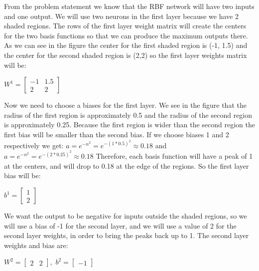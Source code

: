\documentclass{article}
\begin{document}
\noindent From the problem statement we know that the RBF network will have two inputs and one output.
We will use two neurons in the first layer because we have 2 shaded regions. 
The rows of the first layer weight matrix
will create the centers for the two basis functions so that we can produce the maximum outputs there. 
As we can see in the figure the center for the first shaded region
is (-1, 1.5) and the center for the second shaded region is (2,2) so the first layer weights matrix will be: \\
\begin{center}
  
$ W^1 = \begin{bmatrix}
  - 1 & 1.5 \\
  2 & 2
\end{bmatrix} $
\end{center}

\noindent Now we need to choose a biases for the first layer. We see in the figure that the radius of the first 
region is approximately 0.5 and the radius of the second region is approximately 0.25. 
Because the first region is wider than the second region the first bias will be smaller than the second bias.
If we choose biases 1 and 2 respectively we get:
$a = e^{-n^2}= e^{-(1*0.5)^2} \approx 0.18$ and $a = e^{-n^2}= e^{-(2*0.25)^2} \approx 0.18$
Therefore, each basis function will have a peak of 1 at the centers, and will drop to 0.18 at the edge of the regions.
So the first layer bias will be:
\begin{center}
  
  $ b^1 = \begin{bmatrix}
    1 \\
    2 
  \end{bmatrix} $
  \end{center}

  \noindent We want the output to be negative for inputs outside the shaded regions,
  so we will use a bias of -1 for the second layer, and we will use a value of 2
  for the second layer weights, in order to bring the peaks back up to 1. The second layer weights and bias are:

  \begin{center}
  
    $ W^2 = \begin{bmatrix}
      2 & 2
    \end{bmatrix},
     $
    $ b^2 = \begin{bmatrix}
      -1
    \end{bmatrix} $

    \end{center}
  
\end{document}
